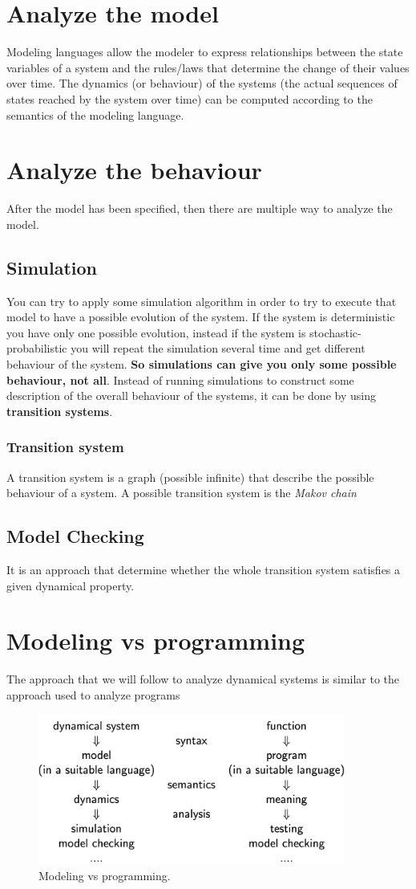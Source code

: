 \section{Analyze the model}
Modeling languages allow the modeler to express relationships between the state variables of a system and the rules/laws that determine the change of their values over time. The dynamics (or behaviour) of the systems (the actual sequences of states reached by the system over time) can be computed according to the semantics of the modeling language.

\section{Analyze the behaviour}
After the model has been specified, then there are multiple way to analyze the model. 

\subsection{Simulation}
You can try to apply some simulation algorithm in order to try to execute that model to have a possible evolution of the system. If the system is deterministic you have only one possible evolution, instead if the system is stochastic-probabilistic you will repeat the simulation several time and get different behaviour of the system. \textbf{So simulations can give you only some possible behaviour, not all}. Instead of running simulations to construct some description of the overall behaviour of the systems, it can be done by using \textbf{transition systems}. 

\subsubsection{Transition system}
A transition system is a graph (possible infinite) that describe the possible behaviour of a system. A possible transition system is the \textit{Makov chain}

\subsection{Model Checking}
It is an approach that determine whether the whole transition system satisfies a given dynamical property.

\section{Modeling vs programming}
The approach that we will follow to analyze dynamical systems is similar to the approach used to analyze programs

\begin{figure}[h]
    \centering
    \includegraphics[width=0.9\textwidth]{Images/01-Introduction/model vs programming.png}
    \caption{Modeling vs programming.}
\end{figure}

